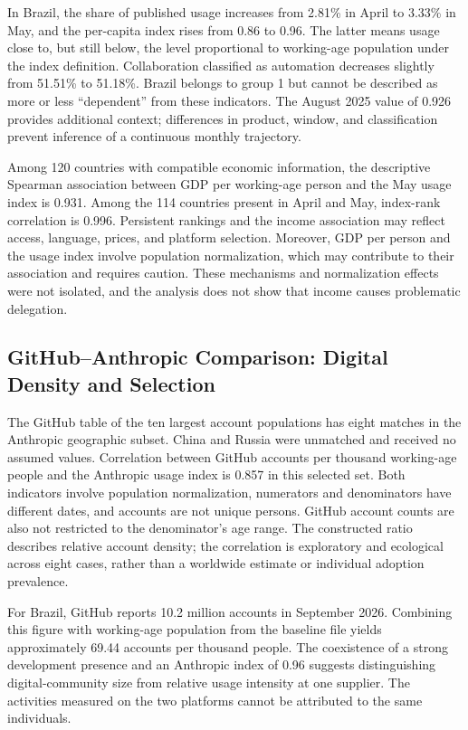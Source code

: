 \documentclass[11pt,a4paper]{article}
\begin{document}
In Brazil, the share of published usage increases from 2.81\% in April to 3.33\% in May, and the per-capita index rises from 0.86 to 0.96. The latter means usage close to, but still below, the level proportional to working-age population under the index definition. Collaboration classified as automation decreases slightly from 51.51\% to 51.18\%. Brazil belongs to group 1 but cannot be described as more or less ``dependent'' from these indicators. The August 2025 value of 0.926 provides additional context; differences in product, window, and classification prevent inference of a continuous monthly trajectory.

Among 120 countries with compatible economic information, the descriptive Spearman association between GDP per working-age person and the May usage index is 0.931. Among the 114 countries present in April and May, index-rank correlation is 0.996. Persistent rankings and the income association may reflect access, language, prices, and platform selection. Moreover, GDP per person and the usage index involve population normalization, which may contribute to their association and requires caution. These mechanisms and normalization effects were not isolated, and the analysis does not show that income causes problematic delegation.

\subsection{GitHub--Anthropic Comparison: Digital Density and Selection}
The GitHub table of the ten largest account populations has eight matches in the Anthropic geographic subset. China and Russia were unmatched and received no assumed values. Correlation between GitHub accounts per thousand working-age people and the Anthropic usage index is 0.857 in this selected set. Both indicators involve population normalization, numerators and denominators have different dates, and accounts are not unique persons. GitHub account counts are also not restricted to the denominator's age range. The constructed ratio describes relative account density; the correlation is exploratory and ecological across eight cases, rather than a worldwide estimate or individual adoption prevalence.

For Brazil, GitHub reports 10.2 million accounts in September 2026. Combining this figure with working-age population from the baseline file yields approximately 69.44 accounts per thousand people. The coexistence of a strong development presence and an Anthropic index of 0.96 suggests distinguishing digital-community size from relative usage intensity at one supplier. The activities measured on the two platforms cannot be attributed to the same individuals.
\end{document}
